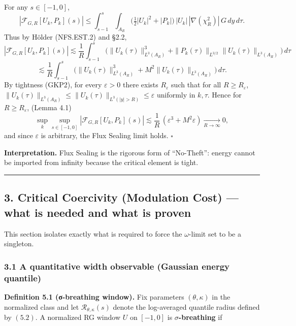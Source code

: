 \documentclass[
  11pt,
]{article}
\begin{document}
For any \(s\in[-1,0]\), \[
|\mathcal{F}_{G,R}[U_k,P_k](s)|
\le \int_{s-1}^{s}\int_{A_R}\Big(\tfrac12 |U_k|^2 + |P_k|\Big)\,|U_k|\,|\nabla(\chi_R^2)|\,G\,dy\,d\tau.
\] Thus by Hölder (NFS.EST.2) and §2.2, \[
|\mathcal{F}_{G,R}[U_k,P_k](s)|
\lesssim \frac1R\int_{s-1}^s
\Big(\|U_k(\tau)\|_{L^3(A_R)}^3 + \|P_k(\tau)\|_{L^{3/2}}\|U_k(\tau)\|_{L^3(A_R)}\Big)\,d\tau
\] \[
\lesssim \frac1R\int_{s-1}^s
\Big(\|U_k(\tau)\|_{L^3(A_R)}^3 + M^2\|U_k(\tau)\|_{L^3(A_R)}\Big)\,d\tau.
\] By tightness (GKP2), for every \(\varepsilon>0\) there exists \(R_\varepsilon\) such that for all \(R\ge R_\varepsilon\), \(\|U_k(\tau)\|_{L^3(A_R)}\le \|U_k(\tau)\|_{L^3(|y|>R)}\le \varepsilon\) uniformly in \(k,\tau\). Hence for \(R\ge R_\varepsilon\), (Lemma 4.1) \[
\sup_k\sup_{s\in[-1,0]}|\mathcal{F}_{G,R}[U_k,P_k](s)|
\lesssim \frac1R\,(\varepsilon^3+M^2\varepsilon)\xrightarrow[R\to\infty]{}0,
\] and since \(\varepsilon\) is arbitrary, the Flux Sealing limit holds. \(\square\)

\textbf{Interpretation.} Flux Sealing is the rigorous form of ``No-Theft'': energy cannot be imported from infinity because the critical element is tight.

\begin{center}\rule{0.5\linewidth}{0.5pt}\end{center}

\hypertarget{critical-coercivity-modulation-cost-what-is-needed-and-what-is-proven}{%
\subsection{3. Critical Coercivity (Modulation Cost) --- what is needed and what is proven}\label{critical-coercivity-modulation-cost-what-is-needed-and-what-is-proven}}

This section isolates exactly what is required to force the \(\omega\)-limit set to be a singleton.

\hypertarget{a-quantitative-width-observable-gaussian-energy-quantile}{%
\subsubsection{3.1 A quantitative width observable (Gaussian energy quantile)}\label{a-quantitative-width-observable-gaussian-energy-quantile}}

\textbf{Definition 5.1 (σ-breathing window).} Fix parameters \((\theta,\kappa)\) in the normalized class and let \(\mathcal R_{\theta,\kappa}(s)\) denote the log-averaged quantile radius defined by \((5.2)\). A normalized RG window \(U\) on \([-1,0]\) is \textbf{\(\sigma\)-breathing} if
\end{document}
